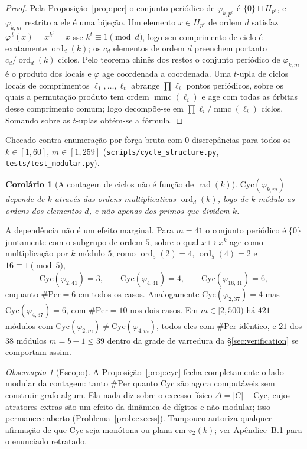 \documentclass[11pt]{article}
\newtheorem{corollary}[theorem]{Corolário}
\theoremstyle{definition}
\theoremstyle{remark}
\newtheorem{remark}[theorem]{Observação}
\newcommand{\Cyc}{\mathrm{Cyc}}
\newcommand{\Per}{\mathrm{Per}}
\DeclareMathOperator{\ord}{ord}
\DeclareMathOperator{\rad}{rad}
\DeclareMathOperator{\mmc}{mmc}
\begin{document}
\begin{proof}
Pela Proposição~\ref{prop:per} o conjunto periódico de $\varphi_{k,p^e}$ é $\{0\} \sqcup H_{p^e}$, e $\varphi_{k,m}$ restrito a ele é uma bijeção. Um elemento $x \in H_{p^e}$ de ordem $d$ satisfaz $\varphi^{\,t}(x) = x^{k^t} = x$ sse $k^t \equiv 1 \pmod d$, logo seu comprimento de ciclo é exatamente $\ord_d(k)$; os $c_d$ elementos de ordem $d$ preenchem portanto $c_d/\ord_d(k)$ ciclos. Pelo teorema chinês dos restos o conjunto periódico de $\varphi_{k,m}$ é o produto dos locais e $\varphi$ age coordenada a coordenada. Uma $t$-upla de ciclos locais de comprimentos $\ell_1,\dots,\ell_t$ abrange $\prod \ell_i$ pontos periódicos, sobre os quais a permutação produto tem ordem $\mmc(\ell_i)$ e age com todas as órbitas desse comprimento comum; logo decompõe-se em $\prod \ell_i / \mmc(\ell_i)$ ciclos. Somando sobre as $t$-uplas obtém-se a fórmula.
\end{proof}

Checado contra enumeração por força bruta com 0 discrepâncias para todos os $k \in [1,60]$, $m \in [1,259]$ (\texttt{scripts/cycle\_structure.py}, \texttt{tests/test\_modular.py}).

\begin{corollary}[A contagem de ciclos não é função de $\rad(k)$]\label{cor:notradical}
$\Cyc(\varphi_{k,m})$ depende de $k$ através das ordens multiplicativas $\ord_d(k)$, logo de $k$ módulo as ordens dos elementos $d$, e não apenas dos primos que dividem $k$.
\end{corollary}

A dependência não é um efeito marginal. Para $m = 41$ o conjunto periódico é $\{0\}$ juntamente com o subgrupo de ordem $5$, sobre o qual $x \mapsto x^k$ age como multiplicação por $k$ módulo $5$; como $\ord_5(2) = 4$, $\ord_5(4) = 2$ e $16 \equiv 1 \pmod 5$,
\[
\Cyc(\varphi_{2,41}) = 3, \qquad \Cyc(\varphi_{4,41}) = 4, \qquad \Cyc(\varphi_{16,41}) = 6,
\]
enquanto $\#\Per = 6$ em todos os casos. Analogamente $\Cyc(\varphi_{2,37}) = 4$ mas $\Cyc(\varphi_{4,37}) = 6$, com $\#\Per = 10$ nos dois casos. Em $m \in [2,500)$ há $421$ módulos com $\Cyc(\varphi_{2,m}) \ne \Cyc(\varphi_{4,m})$, todos eles com $\#\Per$ idêntico, e $21$ dos $38$ módulos $m = b-1 \le 39$ dentro da grade de varredura da \S\ref{sec:verification} se comportam assim.

\begin{remark}[Escopo]
A Proposição~\ref{prop:cyc} fecha completamente o lado modular da contagem: tanto $\#\Per$ quanto $\Cyc$ são agora computáveis sem construir grafo algum. Ela nada diz sobre o excesso físico $\Delta = |C| - \Cyc$, cujos atratores extras são um efeito da dinâmica de dígitos e não modular; isso permanece aberto (Problema~\ref{prob:excess}). Tampouco autoriza qualquer afirmação de que $\Cyc$ seja monótona ou plana em $v_2(k)$; ver Apêndice~B.1 para o enunciado retratado.
\end{remark}
\end{document}
